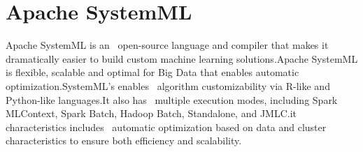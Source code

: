 \section{Apache SystemML}
Apache SystemML is an~\cite{systemml} open-source language and compiler that makes it dramatically easier to build custom machine learning solutions.Apache SystemML is \cite{systemml} flexible, scalable and optimal for Big Data that enables automatic optimization.SystemML’s enables~\cite{systemml} algorithm customizability via R-like and Python-like languages.It also has~\cite{systemml_blog} multiple execution modes, including Spark MLContext, Spark Batch, Hadoop Batch, Standalone, and JMLC.it characteristics includes~\cite{systemml_blog} automatic optimization based on data and cluster characteristics to ensure both efficiency and scalability.
